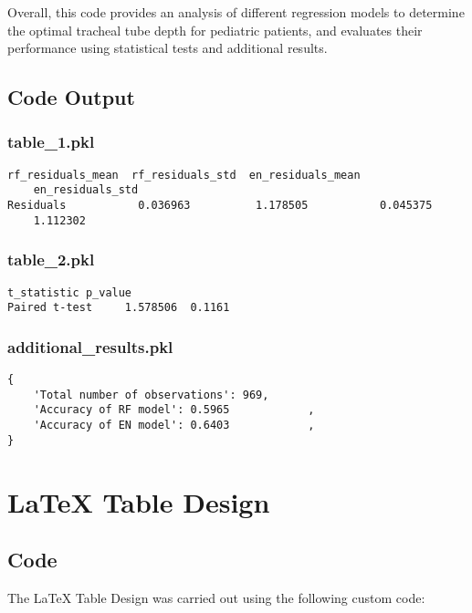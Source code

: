 \documentclass[11pt]{article}
\begin{document}
Overall, this code provides an analysis of different regression models to determine the optimal tracheal tube depth for pediatric patients, and evaluates their performance using statistical tests and additional results.

\subsection{Code Output}

\subsubsection*{table\_1.pkl}

\begin{Verbatim}[tabsize=4]
           rf_residuals_mean  rf_residuals_std  en_residuals_mean
	en_residuals_std
Residuals           0.036963          1.178505           0.045375
	1.112302
\end{Verbatim}

\subsubsection*{table\_2.pkl}

\begin{Verbatim}[tabsize=4]
               t_statistic p_value
Paired t-test     1.578506  0.1161
\end{Verbatim}

\subsubsection*{additional\_results.pkl}

\begin{Verbatim}[tabsize=4]
{
    'Total number of observations': 969,
    'Accuracy of RF model': 0.5965            ,
    'Accuracy of EN model': 0.6403            ,
}
\end{Verbatim}

\section{LaTeX Table Design}
\subsection{{Code}}
The LaTeX Table Design was carried out using the following custom code:
\end{document}
